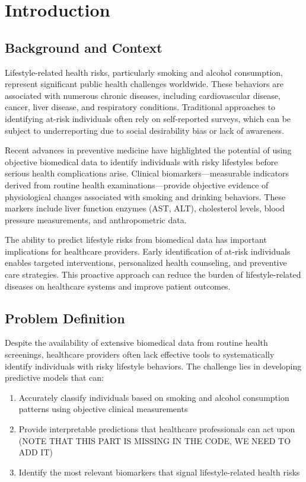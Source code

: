 \documentclass[11pt,a4paper]{article}
\begin{document}
\tableofcontents
\newpage

\section{Introduction}

\subsection{Background and Context}
Lifestyle-related health risks, particularly smoking and alcohol consumption, represent significant public health challenges worldwide. These behaviors are associated with numerous chronic diseases, including cardiovascular disease, cancer, liver disease, and respiratory conditions. Traditional approaches to identifying at-risk individuals often rely on self-reported surveys, which can be subject to underreporting due to social desirability bias or lack of awareness.

\noindent Recent advances in preventive medicine have highlighted the potential of using objective biomedical data to identify individuals with risky lifestyles before serious health complications arise. Clinical biomarkers—measurable indicators derived from routine health examinations—provide objective evidence of physiological changes associated with smoking and drinking behaviors. These markers include liver function enzymes (AST, ALT), cholesterol levels, blood pressure measurements, and anthropometric data.

\noindent The ability to predict lifestyle risks from biomedical data has important implications for healthcare providers. Early identification of at-risk individuals enables targeted interventions, personalized health counseling, and preventive care strategies. This proactive approach can reduce the burden of lifestyle-related diseases on healthcare systems and improve patient outcomes.

\subsection{Problem Definition}

Despite the availability of extensive biomedical data from routine health screenings, healthcare providers often lack effective tools to systematically identify individuals with risky lifestyle behaviors. The challenge lies in developing predictive models that can:
    \begin{enumerate}
    \item Accurately classify individuals based on smoking and alcohol consumption patterns using objective clinical measurements
    \item Provide interpretable predictions that healthcare professionals can act upon (NOTE THAT THIS PART IS MISSING IN THE CODE, WE NEED TO ADD IT)
    \item Identify the most relevant biomarkers that signal lifestyle-related health risks
    \end{enumerate}
\end{document}
